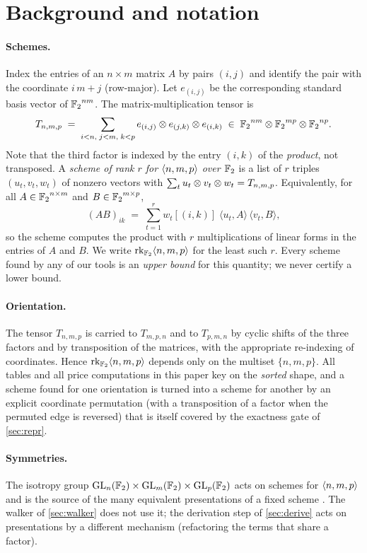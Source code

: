 \section{Background and notation}\label{sec:background}

\paragraph{Schemes.}
Index the entries of an $n\times m$ matrix $A$ by pairs $(i,j)$ and identify the pair with the coordinate $i\,m+j$
(row-major). Let $e_{(i,j)}$ be the corresponding standard basis vector of ${\mathbb{F}_2}^{nm}$. The matrix-multiplication tensor is
\[
  T_{n,m,p} \;=\; \sum_{i<n,\;j<m,\;k<p} e_{(i,j)}\otimes e_{(j,k)}\otimes e_{(i,k)}
  \;\in\; {\mathbb{F}_2}^{nm}\otimes{\mathbb{F}_2}^{mp}\otimes{\mathbb{F}_2}^{np}.
\]
Note that the third factor is indexed by the entry $(i,k)$ of the \emph{product}, not transposed.
A \emph{scheme of rank $r$ for $\langle n,m,p\rangle$ over ${\mathbb{F}_2}$} is a list of $r$ triples $(u_t,v_t,w_t)$ of nonzero vectors with
$\sum_t u_t\otimes v_t\otimes w_t = T_{n,m,p}$. Equivalently, for all $A\in{\mathbb{F}_2}^{n\times m}$ and $B\in{\mathbb{F}_2}^{m\times p}$,
\[
  (AB)_{ik} \;=\; \sum_{t=1}^{r} w_t[(i,k)]\;\langle u_t,A\rangle\,\langle v_t,B\rangle ,
\]
so the scheme computes the product with $r$ multiplications of linear forms in the entries of $A$ and $B$.
We write $\operatorname{rk}_{{\mathbb{F}_2}}\langle n,m,p\rangle$ for the least such $r$. Every scheme found by any of our tools is an \emph{upper bound}
for this quantity; we never certify a lower bound.

\paragraph{Orientation.}
The tensor $T_{n,m,p}$ is carried to $T_{m,p,n}$ and to $T_{p,m,n}$ by cyclic shifts of the three factors and by transposition of the
matrices, with the appropriate re-indexing of coordinates. Hence $\operatorname{rk}_{{\mathbb{F}_2}}\langle n,m,p\rangle$ depends only on the multiset $\{n,m,p\}$. All tables and
all price computations in this paper key on the \emph{sorted} shape, and a scheme found for one orientation is turned into a scheme for
another by an explicit coordinate permutation (with a transposition of a factor when the permuted edge is reversed) that is itself
covered by the exactness gate of \cref{sec:repr}.

\paragraph{Symmetries.}
The isotropy group $\mathrm{GL}_n({\mathbb{F}_2})\times\mathrm{GL}_m({\mathbb{F}_2})\times\mathrm{GL}_p({\mathbb{F}_2})$ acts on schemes for $\langle n,m,p\rangle$ and is the source of
the many equivalent presentations of a fixed scheme \cite{degroote1978isotropy,burichenko2015symmetries}.
The walker of \cref{sec:walker} does not use it; the derivation step of \cref{sec:derive} acts on presentations by a different mechanism
(refactoring the terms that share a factor).


